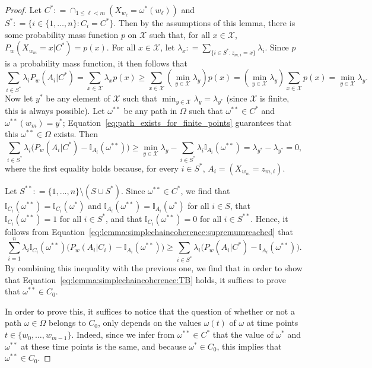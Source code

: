 \documentclass[10pt,a4paper]{paper}
\theoremstyle{definition}
\newcommand{\states}{\mathcal{X}}
\newcommand{\ind}[1]{\mathbb{I}_{#1}}
\newcommand{\coloneqq}{:\!=}
\begin{document}
\begin{proof}
Let $C^*\coloneqq\cap_{1\leq \ell<m}(X_{w_\ell}=\omega^*(w_\ell))$ and $S^*\coloneqq\{i\in\{1,\dots,n\}\colon C_i=C^*\}$. Then by the assumptions of this lemma, there is some probability mass function $p$ on $\states$ such that, for all $x\in\states$, $P_w(X_{w_m}=x\vert C^*)=p(x)$. 
For all $x\in\states$, let $\lambda_x\coloneqq\sum_{\{i\in S^*\colon z_{m,i}=x\}}\lambda_i$.
Since $p$ is a probability mass function, it then follows that
\begin{equation*}
\sum_{i\in S^*}\lambda_i P_w(A_i\vert C^*)
=
\sum_{x\in\states}
\lambda_x p(x)
\geq
\sum_{x\in\states} \left(\min_{y\in\states}\lambda_y\right) p(x)
=
\left(\min_{y\in\states}\lambda_y\right)\sum_{x\in\states}p(x)
=\min_{y\in\states}\lambda_y.
\end{equation*}
Now let $y^*$ be any element of $\states$ such that $\min_{y\in\states}\lambda_y=\lambda_{y^*}$ (since $\states$ is finite, this is always possible). Let $\omega^{**}$ be any path in $\Omega$ such that $\omega^{**}\in C^*$ and $\omega^{**}(w_m)=y^*$; Equation~\eqref{eq:path_exists_for_finite_points} guarantees that this $\omega^{**}\in\Omega$ exists. Then
\begin{equation*}
\sum_{i\in S^*}\lambda_i\bigl(P_w(A_i\vert C^*)-\ind{A_i}(\omega^{**})\bigr)
\geq
\min_{y\in\states}\lambda_y
-\sum_{i\in S^*}\lambda_i\ind{A_i}(\omega^{**})
=\lambda_{y^*}-\lambda_{y^*}=0,
\end{equation*}
where the first equality holds because, for every $i\in S^*$, $A_i=(X_{w_m}=z_{m,i})$.

Let $S^{**}\coloneqq\{1,\dots,n\}\setminus(S\cup S^*)$. Since $\omega^{**}\in C^*$, we find that $\ind{C_i}(\omega^{**})=\ind{C_i}(\omega^{*})$ and $\ind{A_i}(\omega^{**})=\ind{A_i}(\omega^{*})$ for all $i\in S$, that $\ind{C_i}(\omega^{**})=1$ for all $i\in S^{*}$, and that $\ind{C_i}(\omega^{**})=0$ for all $i\in S^{**}$. Hence, it follows from Equation~\eqref{eq:lemma:simplechaincoherence:supremumreached} that
\begin{equation*}
\sum_{i=1}^n\lambda_i\ind{C_i}(\omega^{**})\bigl(P_w(A_i\vert C_i)-\ind{A_i}(\omega^{**})\bigr)
\geq
\sum_{i\in S^*}\lambda_i\bigl(P_w(A_i\vert C^*)-\ind{A_i}(\omega^{**})\bigr).
\end{equation*}
By combining this inequality with the previous one, we find that in order to show that Equation~\eqref{eq:lemma:simplechaincoherence:TB} holds, it suffices to prove that $\omega^{**}\in C_0$. 

In order to prove this, it suffices to notice that the question of whether or not a path $\omega\in\Omega$ belongs to $C_0$, only depends on the values $\omega(t)$ of $\omega$ at time points $t\in\{w_0,\dots,w_{m-1}\}$. Indeed, since we infer from $\omega^{**}\in C^*$ that the value of $\omega^*$ and $\omega^{**}$ at these time points is the same, and because $\omega^*\in C_0$, this implies that $\omega^{**}\in C_0$.
\end{proof}
\end{document}
